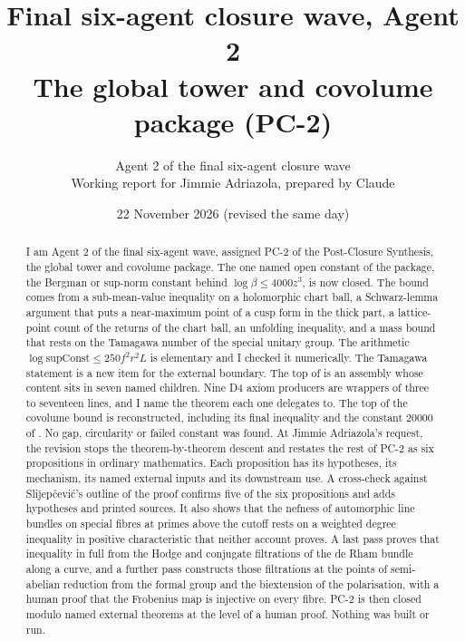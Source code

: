 \documentclass[11pt]{article}
\title{Final six-agent closure wave, Agent 2\\ The global tower and covolume package (PC-2)}
\author{Agent 2 of the final six-agent closure wave\\ Working report for Jimmie Adriazola, prepared by Claude}
\date{22 November 2026 (revised the same day)}
\theoremstyle{remark}
\begin{document}
\maketitle

\begin{abstract}
I am Agent 2 of the final six-agent wave, assigned PC-2 of the Post-Closure Synthesis, the global tower and covolume package. The one named open constant of the package, the Bergman or sup-norm constant behind $\log\beta\le4000z^3$, is now closed. The bound comes from a sub-mean-value inequality on a holomorphic chart ball, a Schwarz-lemma argument that puts a near-maximum point of a cusp form in the thick part, a lattice-point count of the returns of the chart ball, an unfolding inequality, and a mass bound that rests on the Tamagawa number of the special unitary group. The arithmetic $\log\mathrm{supConst}\le250f^2r^2L$ is elementary and I checked it numerically. The Tamagawa statement is a new item for the external boundary. The top of  is an assembly whose content sits in seven named children. Nine D4 axiom producers are wrappers of three to seventeen lines, and I name the theorem each one delegates to. The top of the covolume bound  is reconstructed, including its final inequality  and the constant $20000$ of . No gap, circularity or failed constant was found. At Jimmie Adriazola's request, the revision stops the theorem-by-theorem descent and restates the rest of PC-2 as six propositions in ordinary mathematics. Each proposition has its hypotheses, its mechanism, its named external inputs and its downstream use. A cross-check against Slijepčević's outline of the proof confirms five of the six propositions and adds hypotheses and printed sources. It also shows that the nefness of automorphic line bundles on special fibres at primes above the cutoff rests on a weighted degree inequality in positive characteristic that neither account proves. A last pass proves that inequality in full from the Hodge and conjugate filtrations of the de Rham bundle along a curve, and a further pass constructs those filtrations at the points of semi-abelian reduction from the formal group and the biextension of the polarisation, with a human proof that the Frobenius map is injective on every fibre. PC-2 is then closed modulo named external theorems at the level of a human proof. Nothing was built or run.
\end{abstract}

\tableofcontents
\end{document}
